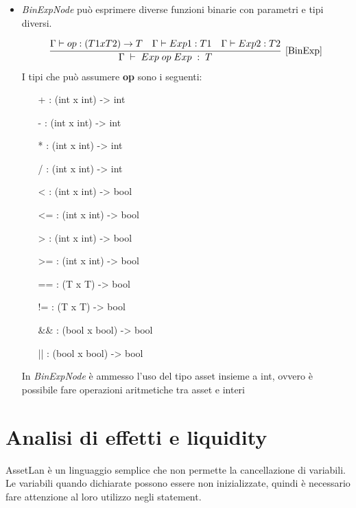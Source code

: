 \documentclass[12pt,twoside,openright,a4paper]{report}
\begin{document}
\begin{itemize}
    \item \textit{BinExpNode} può esprimere diverse funzioni binarie con parametri e tipi diversi.

    \begin{align*}
    \infer[\mathrm{[BinExp]}]
    { \Gamma \hspace{0.1cm} \vdash \hspace{0.1cm} Exp \hspace{0.1cm} op \hspace{0.1cm} Exp \hspace{0.1cm} : \hspace{0.1cm} T   } 
    { \Gamma \vdash op: (T1 x T2) \to T & \Gamma \vdash Exp1: T1 & \Gamma \vdash Exp2:T2}
    \end{align*}
    \newpage
     I tipi che può assumere \textbf{op} sono i seguenti:
    \begin{itemize}
        \item[+] : (int x int) -> int
        \item[-] : (int x int) -> int 
        \item[*] : (int x int) -> int 
        \item[/] : (int x int) -> int 
        \item[<] : (int x int) -> bool
        \item[<=]: (int x int) -> bool
        \item[>] : (int x int) -> bool
        \item[>=]: (int x int) -> bool
        \item[==]: (T x T) -> bool
        \item[!=]: (T x T) -> bool
        \item[\&\&]: (bool x bool) -> bool
        \item[||]: (bool x bool) -> bool
    \end{itemize}
    
    In \textit{BinExpNode} è ammesso l'uso del tipo asset insieme a int, ovvero è possibile fare operazioni aritmetiche tra asset e interi
\end{itemize}


\section{Analisi di effetti e liquidity}
AssetLan è un linguaggio semplice che non permette la cancellazione di variabili. Le variabili quando dichiarate possono essere non inizializzate, quindi è necessario fare attenzione al loro utilizzo negli statement. 
\end{document}
